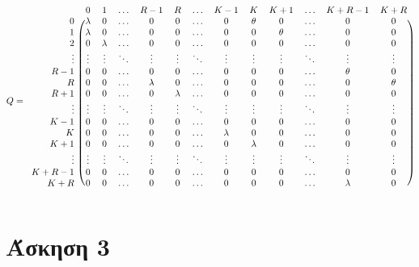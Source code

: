 \documentclass[a4paper,11pt]{article}
\begin{document}
\[
	Q=
	\begin{blockarray}{rcccccccccccc}
		& 0 & 1 & \dots & R-1 & R & \dots & K-1 & K & K+1 & \dots & K+R-1 & K+R \\
		\begin{block}{r(cccccccccccc)}
			0 & \lambda & 0 & \dots & 0 & 0 & \dots & 0 & \theta & 0 & \dots & 0 & 0 \\
			1 & \lambda & 0 & \dots & 0 & 0 & \dots & 0 & 0 & \theta & \dots & 0 & 0 \\
			2 & 0 & \lambda & \dots & 0 & 0 & \dots & 0 & 0 & 0 & \dots & 0 & 0 \\
			\vdots & \vdots & \vdots & \ddots & \vdots & \vdots & \ddots & \vdots & \vdots & \vdots & \ddots & \vdots & \vdots \\
			R-1 & 0 & 0 & \dots & 0 & 0 & \dots & 0 & 0 & 0 & \dots & \theta & 0 \\
			R & 0 & 0 & \dots & \lambda & 0 & \dots & 0 & 0 & 0 & \dots & 0 & \theta \\
			R+1 & 0 & 0 & \dots & 0 & \lambda & \dots & 0 & 0 & 0 & \dots & 0 & 0 \\
			\vdots & \vdots & \vdots & \ddots & \vdots & \vdots & \ddots & \vdots & \vdots & \vdots & \ddots & \vdots & \vdots \\
			K-1 & 0 & 0 & \dots & 0 & 0 & \dots & 0 & 0 & 0 & \dots & 0 & 0 \\
			K & 0 & 0 & \dots & 0 & 0 & \dots & \lambda & 0 & 0 & \dots & 0 & 0 \\
			K+1 & 0 & 0 & \dots & 0 & 0 & \dots & 0 & \lambda & 0 & \dots & 0 & 0 \\
			\vdots & \vdots & \vdots & \ddots & \vdots & \vdots & \ddots & \vdots & \vdots & \vdots & \ddots & \vdots & \vdots \\
			K+R-1 & 0 & 0 & \dots & 0 & 0 & \dots & 0 & 0 & 0 & \dots & 0 & 0 \\
			K+R & 0 & 0 & \dots & 0 & 0 & \dots & 0 & 0 & 0 & \dots & \lambda & 0 \\
		\end{block}
	\end{blockarray}
\]


\section*{Άσκηση 3}
\end{document}
